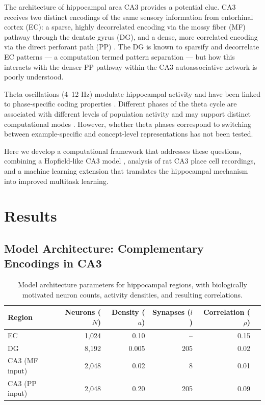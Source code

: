 \documentclass[11pt]{article}
\begin{document}
The architecture of hippocampal area CA3 provides a potential clue. CA3 receives two distinct encodings of the same sensory information from entorhinal cortex (EC): a sparse, highly decorrelated encoding via the mossy fiber (MF) pathway through the dentate gyrus (DG), and a dense, more correlated encoding via the direct perforant path (PP) \citep{marr1971simple, treves1992computational}. The DG is known to sparsify and decorrelate EC patterns --- a computation termed pattern separation \citep{leutgeb2007pattern, yassa2011pattern} --- but how this interacts with the denser PP pathway within the CA3 autoassociative network is poorly understood.

Theta oscillations (4--12 Hz) modulate hippocampal activity and have been linked to phase-specific coding properties \citep{buzsakitheta2002, hasselmo2002proposed, colgin2009frequency}. Different phases of the theta cycle are associated with different levels of population activity and may support distinct computational modes \citep{dragoi2006temporal}. However, whether theta phases correspond to switching between example-specific and concept-level representations has not been tested.

Here we develop a computational framework that addresses these questions, combining a Hopfield-like CA3 model \citep{hopfield1982neural}, analysis of rat CA3 place cell recordings, and a machine learning extension that translates the hippocampal mechanism into improved multitask learning.

\section{Results}

\subsection{Model Architecture: Complementary Encodings in CA3}

\begin{table}[H]
\centering
\caption{Model architecture parameters for hippocampal regions, with biologically motivated neuron counts, activity densities, and resulting correlations.}
\label{tab:architecture}
\begin{tabular}{lrrrrr}
\toprule
\textbf{Region} & \textbf{Neurons ($N$)} & \textbf{Density ($a$)} & \textbf{Synapses ($l$)} & \textbf{Correlation ($\rho$)} \\
\midrule
EC & 1,024 & 0.10 & -- & 0.15 \\
DG & 8,192 & 0.005 & 205 & 0.02 \\
CA3 (MF input) & 2,048 & 0.02 & 8 & 0.01 \\
CA3 (PP input) & 2,048 & 0.20 & 205 & 0.09 \\
\bottomrule
\end{tabular}
\end{table}
\end{document}
